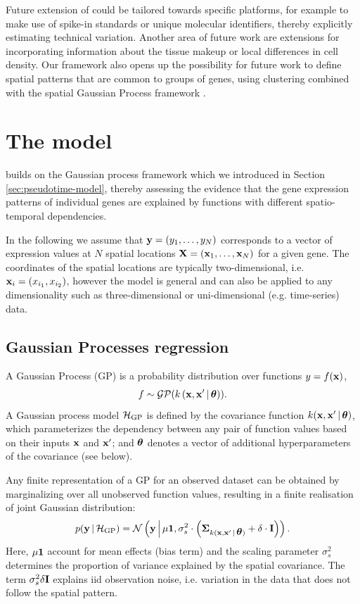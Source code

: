 Future extension of  could be tailored towards specific platforms, for example to make use of spike-in standards or unique molecular identifiers, thereby explicitly estimating technical variation. Another area of future work are extensions for incorporating information about the tissue makeup or local differences in cell density. Our framework also opens up the possibility for future work to define spatial patterns that are common to groups of genes, using clustering combined with the spatial Gaussian Process framework \cite{Hensman2015-op}.

\section{The  model}

 builds on the Gaussian process framework which we introduced in Section \ref{sec:pseudotime-model}, thereby assessing the evidence that the gene expression patterns of individual genes are explained by functions with different spatio-temporal dependencies.

In the following we assume that $ {\bf y} = (y_1,\dots,y_N) $ corresponds to a vector of expression values at $N$ spatial locations $ {\bf X} = ({\bf x}_1,\dots,{\bf x}_N) $ for a given gene.  The coordinates of the spatial locations are typically two-dimensional, i.e. $ {\bf x}_i = (x_{i_1}, x_{i_2}) $, however the model is general and can also be applied to any dimensionality such as three-dimensional or uni-dimensional (e.g. time-series) data. 

\subsection{Gaussian Processes regression}

A Gaussian Process (GP) is a probability distribution over functions $ y = f({\bf x}) $,
\begin{align}
 f \sim \mathcal{GP}(k\left({\bf x},{\bf x}' \,|\, \mbox{\boldmath $\theta$}\right)). 
\end{align}
A Gaussian process model $ \mathcal{H}_{\text{GP}} $ is defined by the covariance function $ k({\bf x},{\bf x}' \,|\, \mbox{\boldmath $\theta$}) $, which parameterizes the dependency between any pair of function values based on their inputs $ {\bf x} $ and $ {\bf x}' $; and $ \mbox{\boldmath $\theta$} $ denotes a vector of additional hyperparameters of the covariance (see below). 

Any finite representation of a GP for an observed dataset can be obtained by marginalizing over all unobserved function values, resulting in a finite realisation of joint Gaussian distribution: 
\begin{align}
\label{eq:GP}
p({\bf y} \,|\, \mathcal{H}_{\text{GP}}) =  \mathcal{N}\left({\bf y} \,\middle | \, \mu {\bf 1}, \sigma_s^2 \cdot \left ( \mbox{\boldmath $\Sigma$}_{k({\bf x},{\bf x}'\,|\, \mbox{\boldmath $\theta$})} + \delta \cdot {\bf I} \right )\right).
\end{align}
Here, $ \mu \bf 1 $ account for mean effects (bias term) and the scaling parameter $ \sigma_s^2 $ determines the proportion of variance explained by the spatial covariance. The term $ \sigma_s^2 \delta {\bf I} $ explains iid observation noise, i.e. variation in the data that does not follow the spatial pattern.


